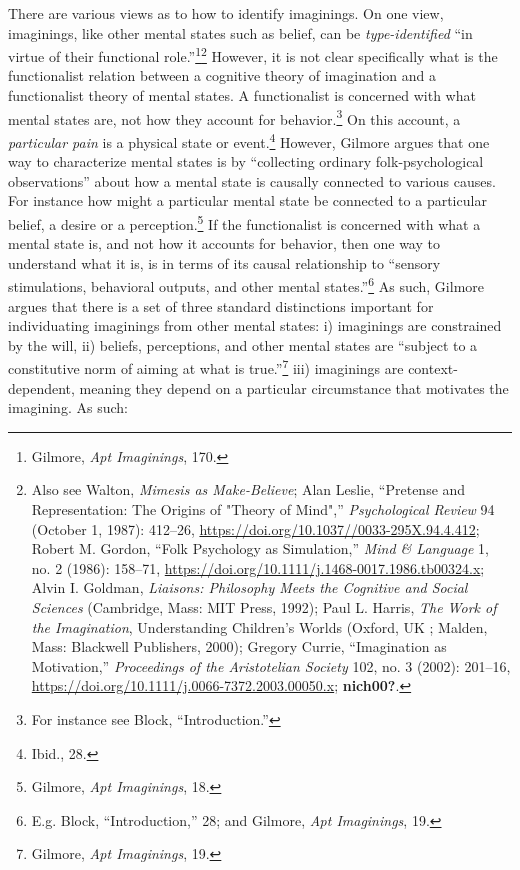 \documentclass[phdthesis,12pt,final]{wuthesis}
\theoremstyle{definition}
\theoremstyle{definition}
\theoremstyle{definition}
\theoremstyle{definition}
\theoremstyle{remark}
\begin{document}
There are various views as to how to identify imaginings. On one view, imaginings, like other mental states such as belief, can be \emph{type-identified} ``in virtue of their functional role.''\footnote{Gilmore, \emph{Apt {Imaginings}}, 170.}\footnote{Also see Walton, \emph{Mimesis as {Make-Believe}}; Alan Leslie, {``Pretense and {Representation}: {The Origins} of "{Theory} of {Mind}",''} \emph{Psychological Review} 94 (October 1, 1987): 412--26, \url{https://doi.org/10.1037//0033-295X.94.4.412}; Robert M. Gordon, {``Folk Psychology as Simulation,''} \emph{Mind \& Language} 1, no. 2 (1986): 158--71, \url{https://doi.org/10.1111/j.1468-0017.1986.tb00324.x}; Alvin I. Goldman, \emph{Liaisons: Philosophy Meets the Cognitive and Social Sciences} (Cambridge, Mass: MIT Press, 1992); Paul L. Harris, \emph{The {Work} of the {Imagination}}, Understanding {Children}'s {Worlds} (Oxford, UK ; Malden, Mass: Blackwell Publishers, 2000); Gregory Currie, {``Imagination as Motivation,''} \emph{Proceedings of the Aristotelian Society} 102, no. 3 (2002): 201--16, \url{https://doi.org/10.1111/j.0066-7372.2003.00050.x}; \textbf{nich00?}.} However, it is not clear specifically what is the functionalist relation between a cognitive theory of imagination and a functionalist theory of mental states. A functionalist is concerned with what mental states are, not how they account for behavior.\footnote{For instance see Block, {``Introduction.''}} On this account, a \emph{particular pain} is a physical state or event.\footnote{Ibid., 28.} However, Gilmore argues that one way to characterize mental states is by ``collecting ordinary folk-psychological observations'' about how a mental state is causally connected to various causes. For instance how might a particular mental state be connected to a particular belief, a desire or a perception.\footnote{Gilmore, \emph{Apt {Imaginings}}, 18.} If the functionalist is concerned with what a mental state is, and not how it accounts for behavior, then one way to understand what it is, is in terms of its causal relationship to ``sensory stimulations, behavioral outputs, and other mental states.''\footnote{E.g. Block, {``Introduction,''} 28; and Gilmore, \emph{Apt {Imaginings}}, 19.} As such, Gilmore argues that there is a set of three standard distinctions important for individuating imaginings from other mental states: i) imaginings are constrained by the will, ii) beliefs, perceptions, and other mental states are ``subject to a constitutive norm of aiming at what is true.''\footnote{Gilmore, \emph{Apt {Imaginings}}, 19.} iii) imaginings are context-dependent, meaning they depend on a particular circumstance that motivates the imagining. As such:
\end{document}
